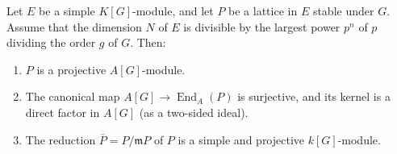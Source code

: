 Let $E$ be a simple $K[G]$-module, and let $P$ be a lattice in $E$ stable under $G$. Assume that the dimension $N$ of $E$ is divisible by the largest power $p^n$ of $p$ dividing the order $g$ of $G$. Then:
\begin{enumerate}
\item[(a)] $P$ is a projective $A[G]$-module.
\item[(b)] The canonical map $A[G] \to \operatorname{End}_A(P)$ is surjective, and its kernel is a direct factor in $A[G]$ (as a two-sided ideal).
\item[(c)] The reduction $\bar{P} = P/\mathfrak{m}P$ of $P$ is a simple and projective $k[G]$-module.
\end{enumerate}
